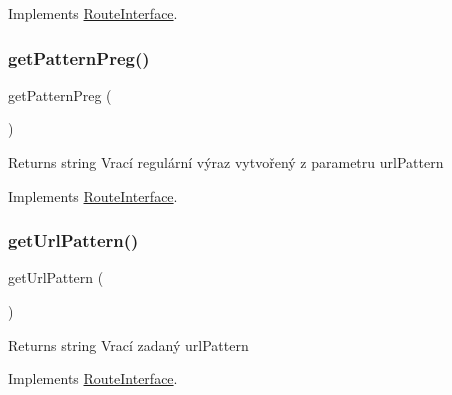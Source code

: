 Implements \mbox{\hyperlink{interface_pes_1_1_router_1_1_route_interface_af3e37e1a6ed9b8c87f86f659873a83b7}{Route\+Interface}}.

\mbox{\label{class_pes_1_1_router_1_1_route_a6ed58fc0798710107b88abfbc32871a1}} 
\subsubsection{\texorpdfstring{get\+Pattern\+Preg()}{getPatternPreg()}}
{\footnotesize\ttfamily get\+Pattern\+Preg (\begin{DoxyParamCaption}{ }\end{DoxyParamCaption})}

\begin{DoxyReturn}{Returns}
string Vrací regulární výraz vytvořený z parametru url\+Pattern 
\end{DoxyReturn}


Implements \mbox{\hyperlink{interface_pes_1_1_router_1_1_route_interface_a6ed58fc0798710107b88abfbc32871a1}{Route\+Interface}}.

\mbox{\label{class_pes_1_1_router_1_1_route_af9358000c7c8783880577ca3751a6984}} 
\subsubsection{\texorpdfstring{get\+Url\+Pattern()}{getUrlPattern()}}
{\footnotesize\ttfamily get\+Url\+Pattern (\begin{DoxyParamCaption}{ }\end{DoxyParamCaption})}

\begin{DoxyReturn}{Returns}
string Vrací zadaný url\+Pattern 
\end{DoxyReturn}


Implements \mbox{\hyperlink{interface_pes_1_1_router_1_1_route_interface_af9358000c7c8783880577ca3751a6984}{Route\+Interface}}.

\mbox{\label{class_pes_1_1_router_1_1_route_a0366b3b0db0bd90abfc461c372f86599}} 
